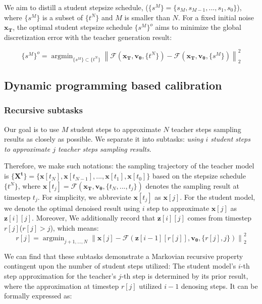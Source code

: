 \documentclass[10pt,twocolumn,letterpaper]{article}
\newcommand{\norm}[1]{\left\lVert#1\right\rVert}
\begin{document}
    
    
    
    
     We aim to distill a student stepsize schedule,
    ($\{s^M\} = \{s_{M},s_{M-1},...,s_{1},s_{0}\}$), where $\{s^M\}$ is a subset of $\{t^N\}$ and $M$ is smaller than $N$. 
    For a fixed initial noise $\bm{x_T}$, the optimal student stepsize schedule $\{s^M\}^o$ aims to minimize the global discretization error with the teacher generation result:

    \begin{equation}
        \{s^M\}^o = \mathop{\arg\min}_{\{s^M\} \subset \{t^N\}}\norm{ \mathcal{F}(\bm{x_T},\bm{v_\theta},\{t^N\}) - \mathcal{F}(\bm{x_T},\bm{v_\theta},\{s^M\}) }^{2}_2
    \end{equation}
    

    
    \subsection{Dynamic programming based calibration}


    \subsubsection{Recursive subtasks}
    Our goal is to use $M$ student steps to approximate $N$ teacher steps sampling results as closely as possible. We separate it into subtasks: \emph{using $i$ student steps to approximate $j$ teacher steps sampling results}.

    Therefore, we make such notations: the sampling trajectory of the teacher model is $\{\bm{X^t}\} = \{\bm{x}[t_N],\bm{x}[t_{N-1}],...,\bm{x}[t_1],\bm{x}[t_0]\}$ based on the stepsize schedule $\{t^N\}$, where $\bm{x}[t_j]=\mathcal{F}(\bm{x_T},\bm{v_\theta},\{t_N,...,t_j\})$ denotes the sampling result at timestep $t_j$. For simplicity, we abbreviate $\bm{x}[t_j]$ as $\bm{x}[j]$. For the student model, we denote the optimal denoised result using $i$ step to approximate $\bm{x}[j]$ as $\bm{z}[i][j]$. Moreover, We additionally record that $\bm{z}[i][j]$ comes from timestep $r[j]$($r[j] > j$), which means:
    \begin{equation} \label{eq:dp1}
        r[j] = \mathop{\arg\min}_{j+1,...,N} \norm{\bm{x}[j] - \mathcal{F}(\bm{z}[i-1][r[j]], \bm{v_\theta}, \{r[j],j\}) }^{2}_2
    \end{equation}

    We can find that these subtasks demonstrate a Markovian recursive property contingent upon the number of student steps utilized: 
    The student model's $i$-th step approximation for the teacher's $j$-th step is determined by its prior result, where the approximation at timestep $r[j]$ utilized $i-1$ denosing steps. It can be formally expressed as:
\end{document}
